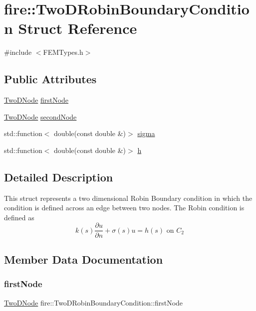\hypertarget{a00780}{}\section{fire\+:\+:Two\+D\+Robin\+Boundary\+Condition Struct Reference}
\label{a00780}


{\ttfamily \#include $<$F\+E\+M\+Types.\+h$>$}

\subsection*{Public Attributes}
\begin{DoxyCompactItemize}
\item 
\hyperlink{a00189_a92dafcc05a788e1065a5792b67f0f70e}{Two\+D\+Node} \hyperlink{a00780_ad4db2466fecae72b4dc5068a4d04ec4a}{first\+Node}
\item 
\hyperlink{a00189_a92dafcc05a788e1065a5792b67f0f70e}{Two\+D\+Node} \hyperlink{a00780_a5cfaf9f512560ea73616ba18471234bf}{second\+Node}
\item 
std\+::function$<$ double(const double \&)$>$ \hyperlink{a00780_ab32818260358435239f283ee40651fe8}{sigma}
\item 
std\+::function$<$ double(const double \&)$>$ \hyperlink{a00780_a41dadd7aa9c2d03978d7f0b7b673d684}{h}
\end{DoxyCompactItemize}


\subsection{Detailed Description}
This struct represents a two dimensional Robin Boundary condition in which the condition is defined across an edge between two nodes. The Robin condition is defined as \[ k(s)\frac{\partial u}{\partial n} + \sigma(s) u = h(s) \mbox{ on } C_{2} \] 

\subsection{Member Data Documentation}
\mbox{\label{a00780_ad4db2466fecae72b4dc5068a4d04ec4a}} 
\subsubsection{\texorpdfstring{first\+Node}{firstNode}}
{\footnotesize\ttfamily \hyperlink{a00189_a92dafcc05a788e1065a5792b67f0f70e}{Two\+D\+Node} fire\+::\+Two\+D\+Robin\+Boundary\+Condition\+::first\+Node}

